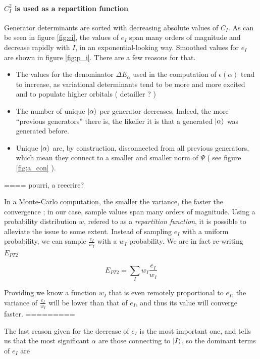 \documentclass[./thesis.tex]{subfiles}
\begin{document}
\paragraph{$C_I^2$ is used as a repartition function}
Generator determinants are sorted with decreasing absolute values of $C_I$.
	As can be seen in figure \ref{fig:ei}, the values of $e_I$ span many orders of magnitude and decrease rapidly with $I$, in an exponential-looking way. Smoothed values for $e_I$ are shown in figure \ref{fig:p_i}. There are a few reasons for that.
\begin{itemize}
	\item
	The values for the denominator $\Delta E_\alpha$ used in the computation of $\epsilon(\alpha)$ tend to increase, as variational determinants tend to be more and more excited and to populate higher orbitals ( detailler ? )
	\item
	The number of unique $\ket \alpha$ per generator decreases. Indeed, the more ``previous generators'' there is, the likelier it is that a generated $\ket \alpha$ was generated before.
	\item
	Unique $\ket \alpha$ are, by construction, disconnected from all previous generators, which mean they connect to a smaller and smaller norm of $\Psi$ ( see figure \ref{fig:a_con} ). 
\end{itemize}

==== pourri, a reecrire?

In a Monte-Carlo computation, the smaller the variance, the faster the convergence ; in our case, sample values span many orders of magnitude. Using a probability distribution $w$, refered to as a \emph{repartition function}, it is possible to alleviate the issue to some extent.
Instead of sampling $e_I$ with a uniform probability, we can sample $\frac{e_I}{w_I}$ with a $w_I$ probability. We are in fact re-writing $E_{PT2}$

\begin{equation}
E_{PT2} = \sum_{I} w_I \frac{e_I}{w_I}
\end{equation}

Providing we know a function $w_I$ that is even remotely proportional to $e_I$, the variance of $\frac{e_I}{w_I}$ will be lower than that of $e_I$, and thus its value will converge faster.
=========

The last reason given for the decrease of $e_I$ is the most important one, and tells us that the most significant $\alpha$ are those connecting to ${\ket{I}}$, so the dominant terms of $e_I$ are 
\end{document}
